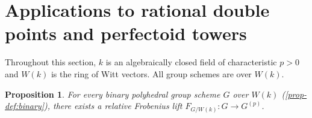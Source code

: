 \documentclass[uplatex,11pt,a4paper]{amsart} %
\numberwithin{equation}{section}
\numberwithin{figure}{section}
\numberwithin{table}{section}
\theoremstyle{plain}
\newtheorem{proposition}[theorem]{Proposition}
\theoremstyle{definition}
\begin{document}
\section{Applications to rational double points and perfectoid towers}
\label{s:RDPtower}

Throughout this section, $k$ is an algebraically closed field of characteristic $p>0$ and $W(k)$ is the ring of Witt vectors. All group schemes are over $W(k)$.



\begin{proposition}
\label{prop:binaryF}
For every binary polyhedral group scheme $G$ over $W(k)$ \textup{(\cref{prop-def:binary})}, there exists a relative Frobenius lift $F_{G/W(k)}\colon G\to G^{(p)}$.
\end{proposition}
\end{document}
